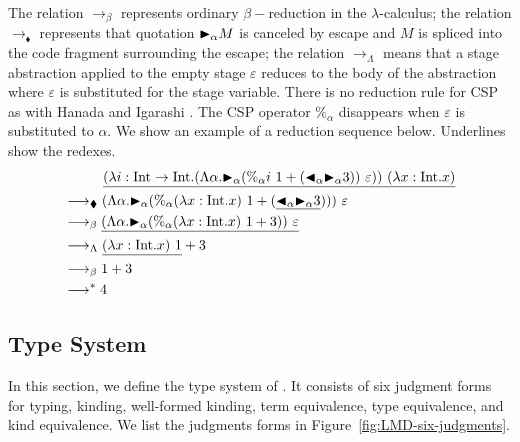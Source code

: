 The relation $\longrightarrow_\beta$ represents ordinary $\beta-$reduction in the \(\lambda\)-calculus; the relation
$\longrightarrow_\blacklozenge$ represents that quotation ${\mathop{\blacktriangleright}}_\alpha M$ is canceled by escape and $M$ is spliced into the code fragment surrounding the escape;
the relation $\longrightarrow_\Lambda$ means that a stage abstraction applied to the empty stage $\varepsilon$ reduces to the body of the abstraction
where $\varepsilon$ is substituted for the stage variable.
There is no reduction rule for CSP as with Hanada and Igarashi \cite{Hanada2014}.
The CSP operator $\%_\alpha$ disappears when $\varepsilon$ is substituted to $\alpha$.
We show an example of a reduction sequence below.
Underlines show the redexes.
\begin{align*}
     & \hspace{10mm} \underline{(\lambda i:\I\to\I.(\Lambda\alpha.\TB_\alpha (\%_\alpha i\ 1 + (\TBL_\alpha \TB_\alpha 3))\ \varepsilon))\ (\lambda x:\I.x)} \\
     & \longrightarrow_\blacklozenge (\Lambda\alpha.\TB_\alpha (\%_\alpha (\lambda x:\I.x)\ 1 + (\underline{\TBL_\alpha \TB_\alpha 3})))\ \varepsilon        \\
     & \longrightarrow_\beta \underline{(\Lambda\alpha.\TB_\alpha (\%_\alpha (\lambda x:\I.x)\ 1 + 3))\ \varepsilon}                                         \\
     & \longrightarrow_\Lambda \underline{(\lambda x:\I.x)\ 1} + 3                                                                                           \\
     & \longrightarrow_\beta 1 + 3                                                                                                                           \\
     & \longrightarrow^* 4
\end{align*}


\subsection{Type System}


In this section, we define the type system of \LMD.
It consists of six judgment forms for typing, kinding, well-formed kinding, term equivalence, type equivalence, and kind equivalence.
We list the judgments forms in Figure~\ref{fig:LMD-six-judgments}.

